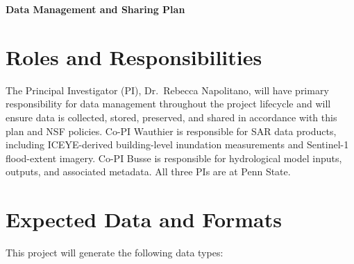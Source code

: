 \documentclass[11pt]{article}
\begin{document}
\pagestyle{empty}

\noindent \textbf{Data Management and Sharing Plan}
\vspace{0.3cm}

\section{Roles and Responsibilities}
The Principal Investigator (PI), Dr.\ Rebecca Napolitano, will have
primary responsibility for data management throughout the project lifecycle and will
ensure data is collected, stored, preserved, and shared in accordance with this plan
and NSF policies.
Co-PI Wauthier is responsible for SAR data products, including ICEYE-derived
building-level inundation measurements and Sentinel-1 flood-extent imagery.
Co-PI Busse is responsible for hydrological model inputs, outputs, and associated
metadata.
All three PIs are at Penn State.

\vspace{0.3cm}
\section{Expected Data and Formats}
This project will generate the following data types:
\end{document}
